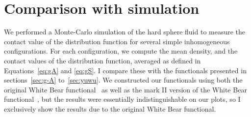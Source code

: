 



\section{Comparison with simulation}\label{sec:comparison}

We performed a Monte-Carlo simulation of the hard sphere fluid to
measure the contact value of the distribution function for several
simple inhomogeneous configurations.  For each configuration, we
compute the mean density, and the contact values of the distribution
function, averaged as defined in Equations~\ref{eq:gA} and
\ref{eq:gS}.  I compare these with the functionals presented in
sections~\ref{sec:g-A} to~\ref{sec:yuwu}.  We constructed our
functionals using both the original White Bear
functional~\cite{roth2002whitebear} as well as the mark II version of
the White Bear functional~\cite{hansen2006density}, but the results
were essentially indistinguishable on our plots, so I exclusively
show the results due to the original White Bear functional.

